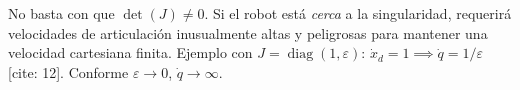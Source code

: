 \documentclass[11pt, a4paper, landscape]{article}
\begin{document}
\vspace{0.2cm}
\begin{tcolorbox}[colback=yellow!10, colframe=orange, title=\textbf{4. El Problema de la Cercanía a la Singularidad (Amplificación de Velocidad)[cite: 12]}]
    No basta con que $\det(J) \neq 0$. Si el robot está \textit{cerca} a la singularidad, requerirá velocidades de articulación inusualmente altas y peligrosas para mantener una velocidad cartesiana finita. 
    Ejemplo con $J = \operatorname{diag}(1, \varepsilon)$: $\dot{x}_d = 1 \implies \dot{q} = 1/\varepsilon$[cite: 12]. Conforme $\varepsilon \to 0$, $\dot{q} \to \infty$.
\end{tcolorbox}
\end{document}
